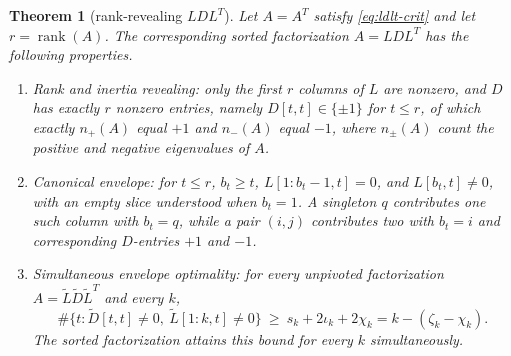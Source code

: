 \documentclass[preprint,12pt]{elsarticle}
\theoremstyle{plain}
\newtheorem{theorem}{Theorem}
\theoremstyle{nonumberplain}
\numberwithin{equation}{section}
\DeclareMathOperator{\rk}{rank}
\numberwithin{theorem}{section}
\begin{document}
\begin{theorem}[rank-revealing $LDL^T$]\label{thm:ldlt-rr}
  Let $A = A^T$ satisfy \cref{eq:ldlt-crit} and let $r = \rk(A)$. The corresponding sorted factorization $A = LDL^T$ has the following properties.
  \begin{enumerate}
    \item \emph{Rank and inertia revealing:} only the first $r$ columns of $L$ are nonzero, and $D$ has exactly $r$ nonzero entries, namely $D[t,t] \in \{\pm 1\}$ for $t \le r$, of which exactly $n_+(A)$ equal $+1$ and $n_-(A)$ equal $-1$, where $n_\pm(A)$ count the positive and negative eigenvalues of $A$.
    \item \emph{Canonical envelope:} for $t\le r$, $b_t\ge t$, $L[1:b_t-1,t]=0$, and $L[b_t,t]\neq0$, with an empty slice understood when $b_t=1$. A singleton $q$ contributes one such column with $b_t=q$, while a pair $(i,j)$ contributes two with $b_t=i$ and corresponding $D$-entries $+1$ and $-1$.
    \item \emph{Simultaneous envelope optimality:} for every unpivoted factorization $A=\widetilde L\widetilde D\widetilde L^T$ and every $k$,
      \[
        \#\{t \colon \widetilde D[t,t]\neq 0,\ \widetilde L[1:k,t]\neq 0\}
        \ \ge\ s_k+2\iota_k+2\chi_k
        = k-(\zeta_k-\chi_k).
      \]
      The sorted factorization attains this bound for every $k$ simultaneously.
  \end{enumerate}
\end{theorem}
\end{document}
